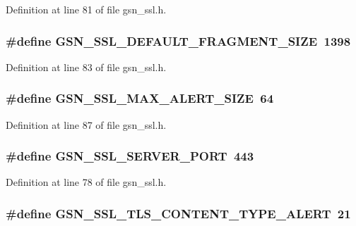 Definition at line 81 of file gsn\_\-ssl.h.

\hypertarget{a00590_af42427aba0f8d775720b905a8474745c}{
\subsubsection[{GSN\_\-SSL\_\-DEFAULT\_\-FRAGMENT\_\-SIZE}]{\setlength{\rightskip}{0pt plus 5cm}\#define GSN\_\-SSL\_\-DEFAULT\_\-FRAGMENT\_\-SIZE~1398}}
\label{a00590_af42427aba0f8d775720b905a8474745c}


Definition at line 83 of file gsn\_\-ssl.h.

\hypertarget{a00590_a1e93d1fd8b3696527ad06eed65b27319}{
\subsubsection[{GSN\_\-SSL\_\-MAX\_\-ALERT\_\-SIZE}]{\setlength{\rightskip}{0pt plus 5cm}\#define GSN\_\-SSL\_\-MAX\_\-ALERT\_\-SIZE~64}}
\label{a00590_a1e93d1fd8b3696527ad06eed65b27319}


Definition at line 87 of file gsn\_\-ssl.h.

\hypertarget{a00590_a81d295a4a574f18257bfc281d7628299}{
\subsubsection[{GSN\_\-SSL\_\-SERVER\_\-PORT}]{\setlength{\rightskip}{0pt plus 5cm}\#define GSN\_\-SSL\_\-SERVER\_\-PORT~443}}
\label{a00590_a81d295a4a574f18257bfc281d7628299}


Definition at line 78 of file gsn\_\-ssl.h.

\hypertarget{a00590_ad535e5cacb88f5dda3ab6b82c8168d03}{
\subsubsection[{GSN\_\-SSL\_\-TLS\_\-CONTENT\_\-TYPE\_\-ALERT}]{\setlength{\rightskip}{0pt plus 5cm}\#define GSN\_\-SSL\_\-TLS\_\-CONTENT\_\-TYPE\_\-ALERT~21}}
\label{a00590_ad535e5cacb88f5dda3ab6b82c8168d03}


